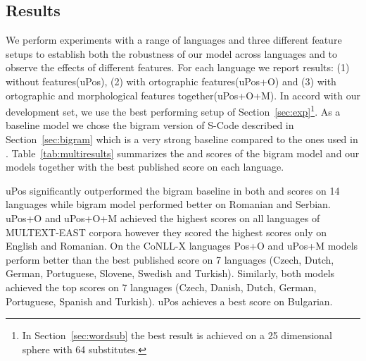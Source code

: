 \subsection{Results}

We perform experiments with a range of languages and three different
feature setups to establish both the robustness of our model across
languages and to observe the effects of different features.  For each
language we report results: (1) without features(uPos), (2) with
ortographic features(uPos+O) and (3) with ortographic and
morphological features together(uPos+O+M).  In accord with our
development set, we use the best performing setup of
Section~\ref{sec:exp}\footnote{In Section~\ref{sec:wordsub} the best
  result is achieved on a 25 dimensional sphere with 64 substitutes.}.
As a baseline model we chose the bigram version of S-Code described in
Section~\ref{sec:bigram} which is a very strong baseline compared to
the ones used in \cite{christodoulopoulos-goldwater-steedman}.
Table~\ref{tab:multiresults} summarizes the \mto and \vm scores of the
bigram model and our models together with the best published score on
each language.

uPos significantly outperformed the bigram baseline in both \mto and
\vm scores on 14 languages while bigram model performed better on
Romanian and Serbian.  uPos+O and uPos+O+M achieved the highest \mto
scores on all languages of MULTEXT-EAST corpora however they scored
the highest \vm scores only on English and Romanian.  On the CoNLL-X
languages Pos+O and uPos+M models perform better than the best
published \mto score on 7 languages (Czech, Dutch, German, Portuguese,
Slovene, Swedish and Turkish).  Similarly, both models achieved the
top \vm scores on 7 languages (Czech, Danish, Dutch, German,
Portuguese, Spanish and Turkish).  uPos achieves a best \mto score on
Bulgarian.

